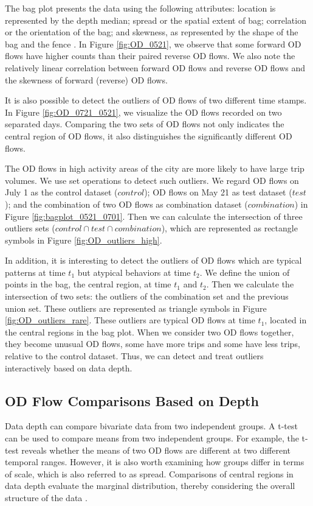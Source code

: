 \documentclass[a4paper,UKenglish]{lipics-v2018}
\begin{document}
The bag plot presents the data using the following attributes: location is represented by the depth median; spread or the spatial extent of bag; correlation or the orientation of the bag; and skewness, as represented by the shape of the bag and the fence \cite{rousseeuw99AS}.
In Figure \ref{fig:OD_0521}, we observe that some forward OD flows have higher counts than their paired reverse OD flows.
We also note the relatively linear correlation between forward OD flows and reverse OD flows and the skewness of forward (reverse) OD flows. 

It is also possible to detect the outliers of OD flows of two different time stamps.
In Figure \ref{fig:OD_0721_0521}, we visualize the OD flows recorded on two separated days.
Comparing the two sets of OD flows not only indicates the central region of OD flows, it also distinguishes the significantly different OD flows. 

The OD flows in high activity areas of the city are more likely to have large trip volumes.
We use set operations to detect such outliers.
We regard OD flows on July 1 as the control dataset ($control$); OD flows on May 21 as test dataset ($test$); and the combination of two OD flows as combination dataset ($combination$) in Figure \ref{fig:bagplot_0521_0701}.
Then we can calculate the intersection of three outliers sets ($control \cap test \cap combination$), which are represented as rectangle symbols in Figure \ref{fig:OD_outliers_high}. 

In addition, it is interesting to detect the outliers of OD flows which are typical patterns at time $t_1$ but atypical behaviors at time $t_2$.
We define the union of points in the bag, the central region, at time $t_1$ and $t_2$.
Then we calculate the intersection of two sets: the outliers of the combination set and the previous union set.
These outliers are represented as triangle symbols in Figure \ref{fig:OD_outliers_rare}.
These outliers are typical OD flows at time $t_1$, located in the central regions in the bag plot.
When we consider two OD flows together, they become unusual OD flows, some have more trips and some have less trips, relative to the control dataset.
Thus, we can detect and treat outliers interactively based on data depth.

\subsection{OD Flow Comparisons Based on Depth}
Data depth can compare bivariate data from two independent groups.
A t-test can be used to compare means from two independent groups.
For example, the t-test reveals whether the means of two OD flows are different at two different temporal ranges.
However, it is also worth examining how groups differ in terms of scale, which is also referred to as spread.
Comparisons of central regions in data depth evaluate the marginal distribution, thereby considering the overall structure of the data \cite{wilcox03MBR}.
\end{document}
